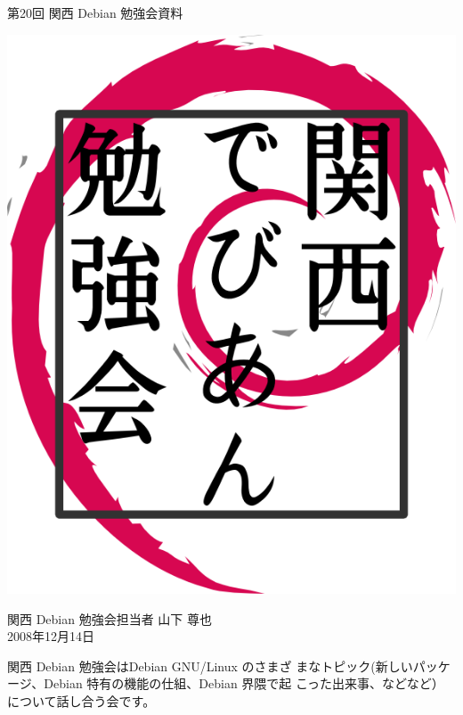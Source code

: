 \documentclass[mingoth,a4paper]{jsarticle}
\newcommand{\debmtgyear}{2008}
\newcommand{\debmtgdate}{14}
\newcommand{\debmtgmonth}{12}
\newcommand{\debmtgnumber}{20}
\begin{document}
\begin{titlepage}


 第\debmtgnumber{}回 関西 Debian 勉強会資料

\vspace{2cm}

\begin{center}
\includegraphics{image200802/kansaidebianlogo.png}
\end{center}

\begin{flushright}
\hfill{}関西 Debian 勉強会担当者 山下 尊也\\
\hfill{}\debmtgyear{}年\debmtgmonth{}月\debmtgdate{}日
\end{flushright}

\thispagestyle{empty}
\end{titlepage}

 
 関西 Debian 勉強会はDebian GNU/Linux のさまざ
 まなトピック(新しいパッケージ、Debian 特有の機能の仕組、Debian 界隈で起
 こった出来事、などなど）について話し合う会です。
\end{document}
